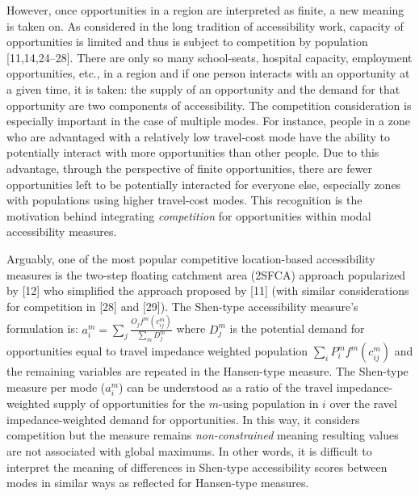 \documentclass[10pt,letterpaper]{article}
\begin{document}
However, once opportunities in a region are interpreted as finite, a new
meaning is taken on. As considered in the long tradition of
accessibility work, capacity of opportunities is limited and thus is
subject to competition by population {[}11,14,24--28{]}. There are only
so many school-seats, hospital capacity, employment opportunities, etc.,
in a region and if one person interacts with an opportunity at a given
time, it is taken: the supply of an opportunity and the demand for that
opportunity are two components of accessibility. The competition
consideration is especially important in the case of multiple modes. For
instance, people in a zone who are advantaged with a relatively low
travel-cost mode have the ability to potentially interact with more
opportunities than other people. Due to this advantage, through the
perspective of finite opportunities, there are fewer opportunities left
to be potentially interacted for everyone else, especially zones with
populations using higher travel-cost modes. This recognition is the
motivation behind integrating \emph{competition} for opportunities
within modal accessibility measures.

Arguably, one of the most popular competitive location-based
accessibility measures is the two-step floating catchment area (2SFCA)
approach popularized by {[}12{]} who simplified the approach proposed by
{[}11{]} (with similar considerations for competition in {[}28{]} and
{[}29{]}). The Shen-type accessibility measure's formulation is:
\(a_i^m = \sum_j \frac{O_jf^m(c_{ij}^m)}{\sum_m D_j^m}\) where \(D_j^m\)
is the potential demand for opportunities equal to travel impedance
weighted population \(\sum_i P_i^m f^m(c_{ij}^m)\) and the remaining
variables are repeated in the Hansen-type measure. The Shen-type measure
per mode (\(a_i^m\)) can be understood as a ratio of the travel
impedance-weighted supply of opportunities for the \(m\)-using
population in \(i\) over the ravel impedance-weighted demand for
opportunities. In this way, it considers competition but the measure
remains \emph{non-constrained} meaning resulting values are not
associated with global maximums. In other words, it is difficult to
interpret the meaning of differences in Shen-type accessibility scores
between modes in similar ways as reflected for Hansen-type measures.
\end{document}
